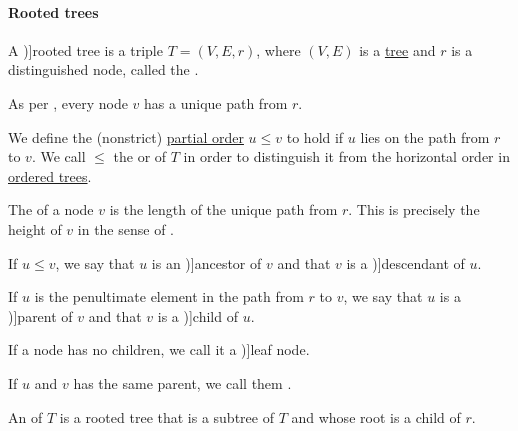 \paragraph{Rooted trees}

\begin{definition}\label{def:rooted_tree}
  A \term[ru=корневое дерево (\cite[\textnumero 9.2.1]{Новиков2013})]{rooted tree} is a triple \( T = (V, E, r) \), where \( (V, E) \) is a \hyperref[def:tree]{tree} and \( r \) is a distinguished node, called the .

  As per , every node \( v \) has a unique path from \( r \).

  \begin{thmenum}
     We define the (nonstrict) \hyperref[def:partially_ordered_set]{partial order} \( u \leq v \) to hold if \( u \) lies on the path from \( r \) to \( v \). We call \( \leq \) the  or  of \( T \) in order to distinguish it from the horizontal order in \hyperref[def:ordered_tree]{ordered trees}.

     The  of a node \( v \) is the length of the unique path from \( r \). This is precisely the height of \( v \) in the sense of .

     If \( u \leq v \), we say that \( u \) is an \term[ru=предок (\cite[298]{БелоусовТкачёв2004})]{ancestor} of \( v \) and that \( v \) is a \term[ru=потомок (\cite[298]{БелоусовТкачёв2004})]{descendant} of \( u \).

     If \( u \) is the penultimate element in the path from \( r \) to \( v \), we say that \( u \) is a \term[ru=отец (\cite[298]{БелоусовТкачёв2004})]{parent} of \( v \) and that \( v \) is a \term[ru=сын (\cite[298]{БелоусовТкачёв2004})]{child} of \( u \).

     If a node has no children, we call it a \term[ru=лист (\cite[298]{БелоусовТкачёв2004})]{leaf node}.

     If \( u \) and \( v \) has the same parent, we call them .

    \mimprovised An  of \( T \) is a rooted tree that is a subtree of \( T \) and whose root is a child of \( r \).
  \end{thmenum}


\end{definition}
